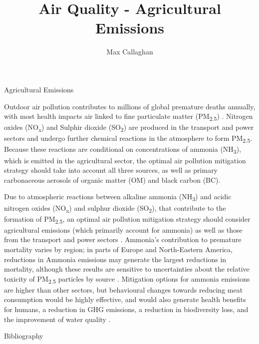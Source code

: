 \documentclass[9pt]{beamer}
\title[Air Quality]{Air Quality - Agricultural Emissions}
\subtitle{}
\author{Max Callaghan}
\institute[MCC]{\texttt{[image: /home/max/Pictures/MCC\_Logo\_RZ\_rgb.jpg]}}
\begin{document}
	
\begin{frame}
	\titlepage
\end{frame}


\begin{frame}{Agricultural Emissions}
	
	Outdoor air pollution contributes to millions of global premature deaths annually, with  most health impacts air linked to fine particulate matter (PM\textsubscript{2.5}) \citep{Lelieveld2015}. Nitrogen oxides (NO\textsubscript{x}) and Sulphir dioxide (SO\textsubscript{2}) are produced in the transport and power sectors and undergo further chemical reactions in the atmosphere to form PM\textsubscript{2.5}. Because these reactions are conditional on concentrations of ammonia (NH\textsubscript{3}), which is emitted in the agricultural sector, the optimal air pollution mitigation strategy should take into account all three sources, as well as primary carbonaceous aerosols of organic matter (OM) and black carbon (BC).
	
	Due to atmospheric reactions between alkaline ammonia (NH\textsubscript{3}) and acidic nitrogen oxides (NO\textsubscript{x}) and sulphur dioxide (SO\textsubscript{2}), that contribute to the formation of PM\textsubscript{2.5}, an optimal air pollution mitigation strategy should consider agricultural emissions (which primarily account for ammonia) as well as those from the transport and power sectors \citep{Wang2015, Lee2015}. Ammonia's contribution to premature mortality varies by region; in parts of Europe and North-Eastern America, reductions in Ammonia emissions may generate the largest reductions in mortality, although these results are sensitive to uncertainties about the relative toxicity of PM\textsubscript{2.5} particles by source \citep{Lee2015, Lelieveld2015}. Mitigation options for ammonia emissions are higher than other sectors, but behavioural changes towards reducing meat consumption would be highly effective, and would also generate health benefits for humans, a reduction in GHG emissions, a reduction in biodiversity loss, and the improvement of water quality \citep{Backes2016, Leip2015}.  

\end{frame}

\begin{frame}{Bibliography}
	\small
	
\end{frame}
\end{document}
